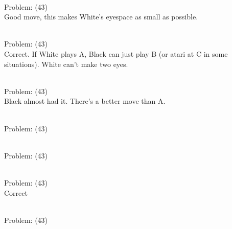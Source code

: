 \documentclass[11pt]{article}
\begin{document}
\begin{minipage}[t]{0.5\textwidth}
  {\centering
  
\\
Problem: (43)\\
Good move, this makes White's eyespace as small as possible.\\
  }
\end{minipage}
\begin{minipage}[t]{0.5\textwidth}
  {\centering
  
\\
Problem: (43)\\
Correct. If White plays A, Black can just play B (or atari at C in some situations). White can't make two eyes.\\
  }
\end{minipage}
\begin{minipage}[t]{0.5\textwidth}
  {\centering
  
\\
Problem: (43)\\
Black almost had it. There's a better move than A.\\
  }
\end{minipage}
\begin{minipage}[t]{0.5\textwidth}
  {\centering
  
\\
Problem: (43)\\
  }
\end{minipage}
\begin{minipage}[t]{0.5\textwidth}
  {\centering
  
\\
Problem: (43)\\
  }
\end{minipage}
\begin{minipage}[t]{0.5\textwidth}
  {\centering
  
\\
Problem: (43)\\
Correct\\
  }
\end{minipage}
\begin{minipage}[t]{0.5\textwidth}
  {\centering
  
\\
Problem: (43)\\
  }
\end{minipage}
\end{document}
